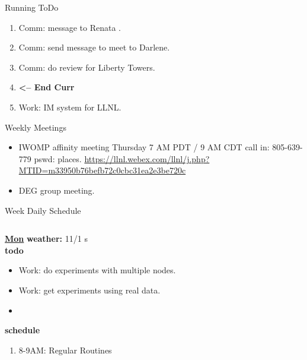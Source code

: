 \begin{columns}
\begin{column}{0.6\linewidth}
\begin{block}{Running ToDo}
\begin{enumerate}
             \item \tiny Comm: message to Renata . 

             \item \tiny Comm: send message to meet to Darlene.  


          \item \tiny Comm: do review for Liberty Towers. 
          \item \tiny \textbf{ <-- End Curr } 
          \item \tiny Work: IM system for LLNL.
        \end{enumerate}
      \end{block}
 

      \begin{block}{Weekly Meetings}
        \begin{itemize}
          \tiny \item \tiny IWOMP affinity meeting Thursday 7 AM PDT / 9 AM
          CDT call in: 805-639-779 pswd: places. \url{https://llnl.webex.com/llnl/j.php?MTID=m33950b76befb72c0cbc31ea2e3be720c}
        \item \tiny DEG group meeting.  
        \end{itemize}
      \end{block} 
      \begin{block}{Week Daily Schedule}
        \begin{columns}
          \begin{column}{0.14\textwidth}{\small \underline{\bf Mon}}
            {\tiny \bf {\tiny weather:} } {\tiny 11/1 s} \\ 
            {\tiny \bf {\tiny todo}}\\ 
            \begin{itemize}
              \tiny \item \tiny Work: do experiments with multiple nodes. 
            \item \tiny Work: get experiments using real data.  
            \item \tiny 
            \end{itemize}
                {\small  \bf schedule}\\
                \begin{enumerate} 
                  \tiny \item \tiny 8-9AM: Regular Routines 
                \end{enumerate}
          \end{column}


\end{columns}
\end{block}
\end{column}
\end{columns}
